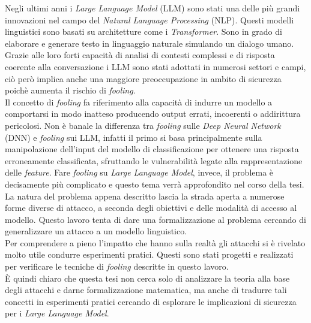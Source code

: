 Negli ultimi anni i \emph{Large Language Model} (LLM) sono stati una delle pi\`u grandi innovazioni nel campo del \emph{Natural Language Processing} (NLP). Questi modelli linguistici sono basati su architetture come i \emph{Transformer}. Sono in grado di elaborare e generare testo in linguaggio naturale simulando un dialogo umano. Grazie alle loro forti capacit\`a di analisi di contesti complessi e di risposta coerente alla conversazione i LLM sono stati adottati in numerosi settori e campi, ci\`o per\`o implica anche una maggiore preoccupazione in ambito di sicurezza poich\`e aumenta il rischio di \emph{fooling}.\\

Il concetto di \emph{fooling} fa riferimento alla capacit\`a di indurre un modello a comportarsi in modo inatteso producendo output errati, incoerenti o addirittura pericolosi. Non \`e banale la differenza tra \emph{fooling} sulle \emph{Deep Neural Network} (DNN) e \emph{fooling} sui LLM, infatti il primo si basa principalmente sulla manipolazione  dell'input del modello di classificazione per ottenere una risposta erroneamente classificata, sfruttando le vulnerabilit\`a legate alla rappresentazione delle \emph{feature}. Fare \emph{fooling} su \emph{Large Language Model}, invece, il problema \`e decisamente pi\`u complicato e questo tema verr\`a approfondito nel corso della tesi.\\
La natura del problema appena descritto lascia la strada aperta a numerose forme diverse di attacco, a seconda degli obiettivi e delle modalit\`a di accesso al modello. Questo lavoro tenta di dare una formalizzazione al problema cercando di generalizzare un attacco a un modello linguistico.\\

Per comprendere a pieno l'impatto che hanno sulla realt\`a gli attacchi si \`e rivelato molto utile condurre esperimenti pratici. Questi sono stati progetti e realizzati per verificare le tecniche di \emph{fooling} descritte in questo lavoro.\\

\`E quindi chiaro che questa tesi non cerca solo di analizzare la teoria alla base degli attacchi e darne formalizzazione matematica, ma anche di tradurre tali concetti in esperimenti pratici cercando di esplorare le implicazioni di sicurezza per i \emph{Large Language Model}.